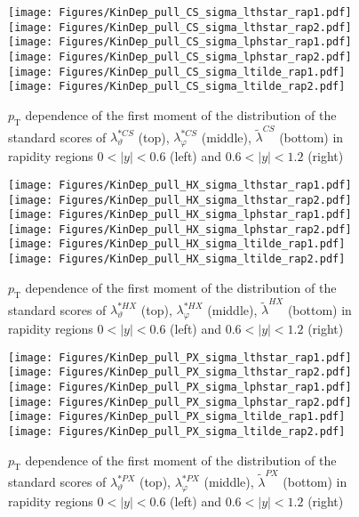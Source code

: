 \documentclass[12pt]{article}
\newcommand{\pT}{p_\mathrm{T}}
\newcommand{\absy}{\left |  y \right |}
\newcommand{\lamtildeCS}{\tilde{\lambda}^{\scriptscriptstyle CS}}
\newcommand{\lamthstarCS}{\lambda^{* \scriptscriptstyle CS}_\vartheta}
\newcommand{\lamphstarCS}{\lambda^{* \scriptscriptstyle CS}_\varphi}
\newcommand{\lamtildeHX}{\tilde{\lambda}^{\scriptscriptstyle HX}}
\newcommand{\lamthstarHX}{\lambda^{* \scriptscriptstyle HX}_\vartheta}
\newcommand{\lamphstarHX}{\lambda^{* \scriptscriptstyle HX}_\varphi}
\newcommand{\lamtildePX}{\tilde{\lambda}^{\scriptscriptstyle PX}}
\newcommand{\lamthstarPX}{\lambda^{* \scriptscriptstyle PX}_\vartheta}
\newcommand{\lamphstarPX}{\lambda^{* \scriptscriptstyle PX}_\varphi}
\begin{document}
\begin{figure}[htbp]
\centering
\texttt{[image: Figures/KinDep\_pull\_CS\_sigma\_lthstar\_rap1.pdf]}
\texttt{[image: Figures/KinDep\_pull\_CS\_sigma\_lthstar\_rap2.pdf]}
\texttt{[image: Figures/KinDep\_pull\_CS\_sigma\_lphstar\_rap1.pdf]}
\texttt{[image: Figures/KinDep\_pull\_CS\_sigma\_lphstar\_rap2.pdf]}
\texttt{[image: Figures/KinDep\_pull\_CS\_sigma\_ltilde\_rap1.pdf]}
\texttt{[image: Figures/KinDep\_pull\_CS\_sigma\_ltilde\_rap2.pdf]}
\caption{$\pT$ dependence of the first moment of the distribution of the
standard scores of $\lamthstarCS$ (top), $\lamphstarCS$ (middle), $\lamtildeCS$
(bottom) in rapidity regions $0<\absy<0.6$ (left) and $0.6<\absy<1.2$ (right)}
\end{figure}
\clearpage


\begin{figure}[htbp]
\centering
\texttt{[image: Figures/KinDep\_pull\_HX\_sigma\_lthstar\_rap1.pdf]}
\texttt{[image: Figures/KinDep\_pull\_HX\_sigma\_lthstar\_rap2.pdf]}
\texttt{[image: Figures/KinDep\_pull\_HX\_sigma\_lphstar\_rap1.pdf]}
\texttt{[image: Figures/KinDep\_pull\_HX\_sigma\_lphstar\_rap2.pdf]}
\texttt{[image: Figures/KinDep\_pull\_HX\_sigma\_ltilde\_rap1.pdf]}
\texttt{[image: Figures/KinDep\_pull\_HX\_sigma\_ltilde\_rap2.pdf]}
\caption{$\pT$ dependence of the first moment of the distribution of the
standard scores of $\lamthstarHX$ (top), $\lamphstarHX$ (middle), $\lamtildeHX$
(bottom) in rapidity regions $0<\absy<0.6$ (left) and $0.6<\absy<1.2$ (right)}
\end{figure}
\clearpage


\begin{figure}[htbp]
\centering
\texttt{[image: Figures/KinDep\_pull\_PX\_sigma\_lthstar\_rap1.pdf]}
\texttt{[image: Figures/KinDep\_pull\_PX\_sigma\_lthstar\_rap2.pdf]}
\texttt{[image: Figures/KinDep\_pull\_PX\_sigma\_lphstar\_rap1.pdf]}
\texttt{[image: Figures/KinDep\_pull\_PX\_sigma\_lphstar\_rap2.pdf]}
\texttt{[image: Figures/KinDep\_pull\_PX\_sigma\_ltilde\_rap1.pdf]}
\texttt{[image: Figures/KinDep\_pull\_PX\_sigma\_ltilde\_rap2.pdf]}
\caption{$\pT$ dependence of the first moment of the distribution of the
standard scores of $\lamthstarPX$ (top), $\lamphstarPX$ (middle), $\lamtildePX$
(bottom) in rapidity regions $0<\absy<0.6$ (left) and $0.6<\absy<1.2$ (right)}
\end{figure}
\clearpage
\end{document}
